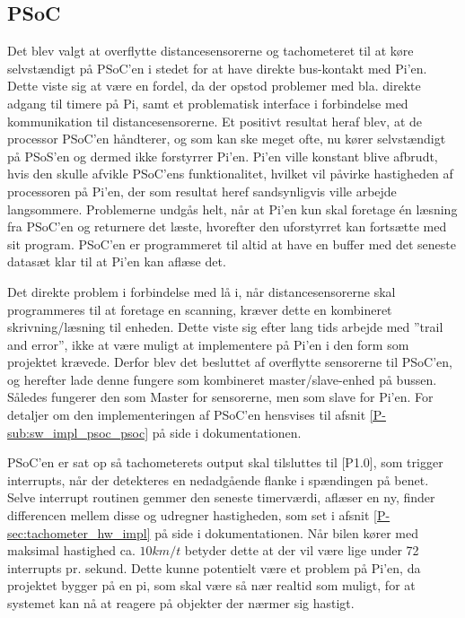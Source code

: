 \subsection{PSoC} \label{sec:swd_psoc_board}

Det blev valgt at overflytte distancesensorerne og tachometeret til at køre selvstændigt på PSoC'en i stedet for at have direkte bus-kontakt med Pi'en. 
Dette viste sig at være en fordel, da der opstod problemer med bla. direkte adgang til timere på Pi, samt et problematisk interface i forbindelse med \IIC kommunikation til distancesensorerne.
Et positivt resultat heraf blev, at de processor PSoC'en håndterer, og som kan ske meget ofte, nu kører selvstændigt på PSoS'en og dermed ikke forstyrrer Pi'en.
Pi'en ville konstant blive afbrudt, hvis den skulle afvikle PSoC'ens funktionalitet, hvilket vil påvirke hastigheden af processoren på Pi'en, der som resultat heref sandsynligvis ville arbejde langsommere.
Problemerne undgås helt, når at Pi'en kun skal foretage én læsning fra PSoC'en og returnere det læste, hvorefter den uforstyrret kan fortsætte med sit program.
PSoC'en er programmeret til altid at have en buffer med det seneste datasæt klar til at Pi'en kan aflæse det. 

Det direkte problem i forbindelse med \IIC lå i, når distancesensorerne skal programmeres til at foretage en scanning, kræver dette en kombineret skrivning/læsning til enheden. 
Dette viste sig efter lang tids arbejde med ''trail and error'', ikke at være muligt at implementere på Pi'en i den form som projektet krævede. 
Derfor blev det besluttet af overflytte sensorerne til PSoC'en, og herefter lade denne fungere som kombineret master/slave-enhed på \IIC bussen. 
Således fungerer den som Master for sensorerne, men som slave for Pi'en. For detaljer om den implementeringen af PSoC'en hensvises til afsnit \ref{P-sub:sw_impl_psoc_psoc}  på side \pageref{P-sub:sw_impl_psoc_psoc} i dokumentationen.

PSoC'en er sat op så tachometerets output skal tilsluttes til [P1.0], som trigger interrupts, når der detekteres en nedadgående flanke i spændingen på benet. 
Selve interrupt routinen gemmer den seneste timerværdi, aflæser en ny, finder differencen mellem disse og udregner hastigheden, som set i afsnit 
\ref{P-sec:tachometer_hw_impl}  på side \pageref{P-sec:tachometer_hw_impl} i dokumentationen. 
Når bilen kører med maksimal hastighed ca. $10km/t$ betyder dette at der vil være lige under 72 interrupts pr. sekund. 
Dette kunne potentielt være et problem på Pi'en, da projektet bygger på en pi, som skal være så nær realtid som muligt, for at systemet kan nå at reagere på objekter der nærmer sig hastigt.

